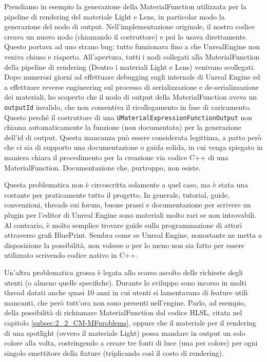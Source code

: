 \documentclass[main.tex]{subfiles}
\begin{document}
Prendiamo in esempio la generazione della MaterialFunction utilizzata per la pipeline di rendering del materiale Light e Lens, in particolar modo la generazione del nodo di output. Nell'implementazione originale, il nostro codice creava un nuovo nodo (chiamando il costruttore) e poi lo usava direttamente. Questo portava ad uno strano bug: tutto funzionava fino a che UnrealEngine non veniva chiuso e riaperto. All'apertura, tutti i nodi collegati alla MaterialFunction della pipeline di rendering (Dentro i materiali Light e Lens) venivano scollegati. Dopo numerosi giorni ad effettuare debugging sugli internals di Unreal Engine ed a effettuare reverse engineering sul processo di serializzazione e de-serializzazione dei materiali, ho scoperto che il nodo di output della MaterialFunction aveva un \lstinline{outputId} invalido, che non consentiva il ricollegamento in fase di caricamento. Questo perché il costruttore di una \lstinline{UMaterialExpressionFunctionOutput} non chiama automaticamente la funzione (non documentata) per la generazione dell'id di output. Questa mancanza può essere considerata legittima, a patto però che ci sia di supporto una documentazione o guida solida, in cui venga spiegato in maniera chiara il procedimento per la creazione via codice C++ di una MaterialFunction. Documentazione che, purtroppo, non esiste.

Questa problematica non è circoscritta solamente a quel caso, ma è stata una costante per praticamente tutto il progetto. In generale, tutorial, guide, convenzioni, threads sui forum, buone prassi e documentazione per scrivere un plugin per l'editor di Unreal Engine sono materiali molto rari se non introvabili. Al contrario, è molto semplice trovare guide sulla programmazione di attori attraverso grafi BluePrint. Sembra come se Unreal Engine, nonostante ne metta a disposizione la possibilità, non volesse o per lo meno non sia fatto per essere utilizzato scrivendo codice nativo in C++.
\newline

Un'altra problematica grossa è legata allo scarso ascolto delle richieste degli utenti (o almeno quelle specifiche). Durante lo sviluppo sono incorso in molti thread datati anche quasi 10 anni in cui utenti si lamentavano di feature utili mancanti, che però tutt'ora non sono presenti nell'engine. Parlo, ad esempio, della possibilità di richiamare MaterialFunction dal codice HLSL, citata nel capitolo \ref{subsec:2_2_CM-MFproblems}, oppure che il materiale per il rendering di una spotlight (ovvero il materiale Light) possa mandare in output un solo colore alla volta, costringendo a creare tre fonti di luce (una per colore) per ogni singolo emettitore della fixture (triplicando così il costo di rendering). \cite{rgbSpotlight}\newline
\end{document}
